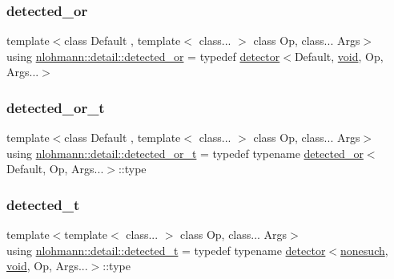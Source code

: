 \subsubsection{\texorpdfstring{detected\+\_\+or}{detected\_or}}
{\footnotesize\ttfamily template$<$class Default , template$<$ class... $>$ class Op, class... Args$>$ \\
using \hyperlink{namespacenlohmann_1_1detail_a240ce21919ab08e8a6cb3a5cfa412bce}{nlohmann\+::detail\+::detected\+\_\+or} = typedef \hyperlink{structnlohmann_1_1detail_1_1detector}{detector}$<$Default, \hyperlink{namespacenlohmann_1_1detail_a59fca69799f6b9e366710cb9043aa77d}{void}, Op, Args...$>$}

\mbox{\label{namespacenlohmann_1_1detail_a7ac5b8ef0363101275a2827b3b117dcf}} 
\subsubsection{\texorpdfstring{detected\+\_\+or\+\_\+t}{detected\_or\_t}}
{\footnotesize\ttfamily template$<$class Default , template$<$ class... $>$ class Op, class... Args$>$ \\
using \hyperlink{namespacenlohmann_1_1detail_a7ac5b8ef0363101275a2827b3b117dcf}{nlohmann\+::detail\+::detected\+\_\+or\+\_\+t} = typedef typename \hyperlink{namespacenlohmann_1_1detail_a240ce21919ab08e8a6cb3a5cfa412bce}{detected\+\_\+or}$<$Default, Op, Args...$>$\+::type}

\mbox{\label{namespacenlohmann_1_1detail_a37e97a32d0b94ce5f745427e4e40204d}} 
\subsubsection{\texorpdfstring{detected\+\_\+t}{detected\_t}}
{\footnotesize\ttfamily template$<$template$<$ class... $>$ class Op, class... Args$>$ \\
using \hyperlink{namespacenlohmann_1_1detail_a37e97a32d0b94ce5f745427e4e40204d}{nlohmann\+::detail\+::detected\+\_\+t} = typedef typename \hyperlink{structnlohmann_1_1detail_1_1detector}{detector}$<$\hyperlink{structnlohmann_1_1detail_1_1nonesuch}{nonesuch}, \hyperlink{namespacenlohmann_1_1detail_a59fca69799f6b9e366710cb9043aa77d}{void}, Op, Args...$>$\+::type}

